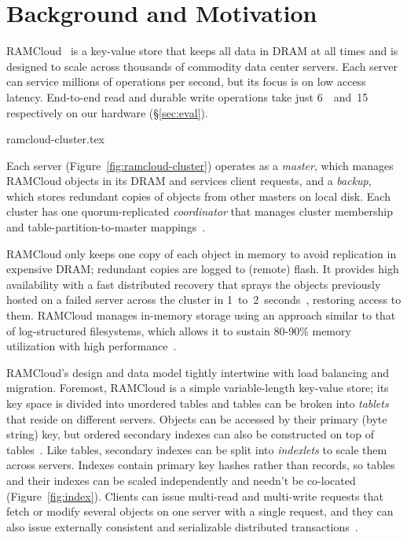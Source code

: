 \section{Background and Motivation}
\label{sec:motivation}

RAMCloud~\cite{ramcloud} is a key-value store that keeps all data in
DRAM at all times and is designed to scale across thousands of commodity data
center servers. Each server can service millions of operations per
second, but its focus is on low access latency.  End-to-end read and durable
write operations take just 6~\us~and~15~\us
respectively on our hardware (\S\ref{sec:eval}).

 {ramcloud-cluster.tex}

Each server (Figure~\ref{fig:ramcloud-cluster}) operates as a \emph{master},
which manages RAMCloud objects in its DRAM and services client requests, and a
\emph{backup}, which stores redundant copies of objects from other masters on
local disk.  Each cluster has one quorum-replicated \emph{coordinator} that
manages cluster membership and table-partition-to-master mappings~\cite{ongaro:raft}.

RAMCloud only keeps one copy of each object in memory to avoid replication in
expensive DRAM; redundant copies are logged to (remote) flash.  It provides
high availability with a fast distributed recovery that sprays the objects 
previously hosted on
a failed server across the cluster in
1~to~2~seconds~\cite{ramcloud-recovery}, restoring access to them.
RAMCloud manages
in-memory storage using an approach similar to that of log-structured
filesystems, which allows it to sustain 80-90\% memory utilization
with high performance~\cite{ramcloud-lsm}.

RAMCloud's design and data model tightly intertwine with load balancing and migration.
Foremost, RAMCloud is a simple variable-length key-value store; its key space
is divided into unordered tables and tables can be broken into {\em tablets}
that reside on different servers.  Objects can be accessed by their primary (byte
string) key, but ordered secondary indexes can also be constructed on top of
tables~\cite{ramcloud-slik}. Like tables, secondary indexes can be split into
{\em indexlets} to scale them across servers. Indexes contain primary key hashes
rather than records, so tables and their indexes can be scaled independently
and needn't be co-located (Figure~\ref{fig:index}). Clients can issue multi-read
and multi-write requests that fetch or modify several objects on one server with
a single request, and they can also issue externally consistent and serializable
distributed transactions~\cite{ramcloud-rifl}.

